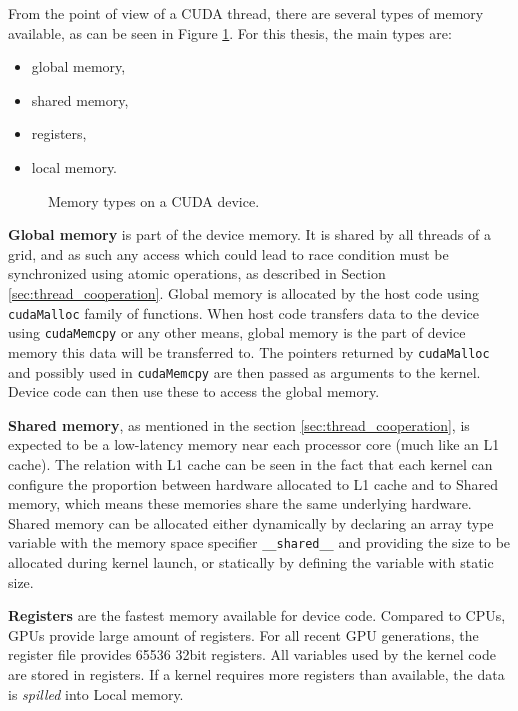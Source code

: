 From the point of view of a CUDA thread, there are several types of memory available, as can be seen in Figure \ref{fig:memory_types}. For this thesis, the main types are:

\begin{itemize}
	\item global memory,
	\item shared memory,
	\item registers,
	\item local memory.
\end{itemize}

\begin{figure}[ht]
	\centering
	\def\svgwidth{\textwidth}
	\fontsize{6}{8}\selectfont
	
	\caption{Memory types on a CUDA device.}
	\label{fig:memory_types}
\end{figure}


\textbf{Global memory} is part of the device memory. It is shared by all threads of a grid, and as such any access which could lead to race condition must be synchronized using atomic operations, as described in Section \ref{sec:thread_cooperation}. Global memory is allocated by the host code using \texttt{cudaMalloc} family of functions. When host code transfers data to the device using \texttt{cudaMemcpy} or any other means, global memory is the part of device memory this data will be transferred to. The pointers returned by \texttt{cudaMalloc} and possibly used in \texttt{cudaMemcpy} are then passed as arguments to the kernel. Device code can then use these to access the global memory. 

\textbf{Shared memory}, as mentioned in the section \ref{sec:thread_cooperation}, is expected to be a low-latency memory near each processor core (much like an L1 cache). The relation with L1 cache can be seen in the fact that each kernel can configure the proportion between hardware allocated to L1 cache and to Shared memory, which means these memories share the same underlying hardware. Shared memory can be allocated either dynamically by declaring an array type variable with the memory space specifier \texttt{\_\_shared\_\_} and providing the size to be allocated during kernel launch, or statically by defining the variable with static size.

\textbf{Registers} are the fastest memory available for device code. Compared to CPUs, GPUs provide large amount of registers. For all recent GPU generations, the register file provides 65536 32bit registers. All variables used by the kernel code are stored in registers. If a kernel requires more registers than available, the data is \textit{spilled} into Local memory.

